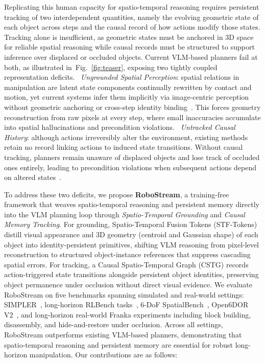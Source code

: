 Replicating this human capacity for spatio-temporal reasoning requires persistent tracking of two interdependent quantities, namely the evolving geometric state of each object across steps and the causal record of how actions modify those states. Tracking alone is insufficient, as geometric states must be anchored in 3D space for reliable spatial reasoning while causal records must be structured to support inference over displaced or occluded objects. 
Current VLM-based planners fail at both, as illustrated in~Fig.~\ref{fig:teaser}, exposing two tightly coupled representation deficits.
~\textit{Ungrounded Spatial Perception}: spatial relations in manipulation are latent state components continually rewritten by contact and motion, yet current systems infer them implicitly via image-centric perception without geometric anchoring or cross-step identity binding~\cite{chen2024spatialvlm, huang2024copa, yuan2025robopoint}. This forces geometry reconstruction from raw pixels at every step, where small inaccuracies accumulate into spatial hallucinations and precondition violations.
~\textit{Untracked Causal History}: although actions irreversibly alter the environment, existing methods retain no record linking actions to induced state transitions. Without causal tracking, planners remain unaware of displaced objects and lose track of occluded ones entirely, leading to precondition violations when subsequent actions depend on altered states~\cite{wen2025dexvla, zhen20243d}.


To address these two deficits, we propose \textbf{RoboStream}, a training-free framework that weaves spatio-temporal reasoning and persistent memory directly into the VLM planning loop through \textit{Spatio-Temporal Grounding} and \textit{Causal Memory Tracking}. For grounding, Spatio-Temporal Fusion Tokens (STF-Tokens) distill visual appearance and 3D geometry (centroid and Gaussian shape) of each object into identity-persistent primitives, shifting VLM reasoning from pixel-level reconstruction to structured object-instance references that suppress cascading spatial errors. For tracking, a Causal Spatio-Temporal Graph (CSTG) records action-triggered state transitions alongside persistent object identities, preserving object permanence under occlusion without direct visual evidence.
We evaluate RoboStream on five benchmarks spanning simulated and real-world settings: SIMPLER~\cite{li2025evaluating}, long-horizon RLBench tasks~\cite{james2020rlbench}, 6-DoF SpatialBench~\cite{qisofar}, Open6DOR V2~\cite{ding2024open6dor}, and long-horizon real-world Franka experiments including block building, disassembly, and hide-and-restore under occlusion.
Across all settings, RoboStream outperforms existing VLM-based planners, demonstrating that spatio-temporal reasoning and persistent memory are essential for robust long-horizon manipulation.
Our contributions are as follows:

